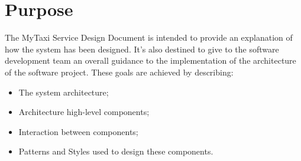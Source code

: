 \documentclass[../../../../dd.tex]{subfiles}
\begin{document}
	\section{Purpose}
		The MyTaxi Service Design Document is intended to provide an explanation of how the system has been designed. It's also destined to give to the software development team an overall guidance to the implementation of the architecture of the software project.
		These goals are achieved by describing:
		\begin{itemize}
			\item The system architecture;
			\item Architecture high-level components;
			\item Interaction between components;
			\item Patterns and Styles used to design these components.
		\end{itemize}
		
\end{document}
